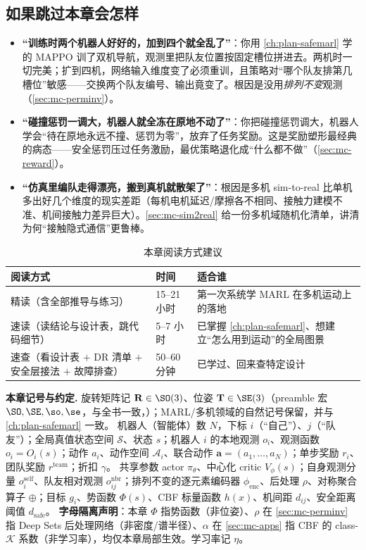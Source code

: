 \subsection*{如果跳过本章会怎样}
\begin{itemize}
  \item \textbf{“训练时两个机器人好好的，加到四个就全乱了”}：你用 \cref{ch:plan-safemarl} 学的 MAPPO 训了双机导航，观测里把队友位置按固定槽位拼进去。两机时一切完美；扩到四机，网络输入维度变了必须重训，且策略对“哪个队友排第几槽位”敏感——交换两个队友编号、输出竟变了。根因是没用\emph{排列不变}观测（\cref{sec:mc-perminv}）。
  \item \textbf{“碰撞惩罚一调大，机器人就全冻在原地不动了”}：你把碰撞惩罚调大，机器人学会“待在原地永远不撞、惩罚为零”，放弃了任务奖励。这是奖励塑形最经典的病态——安全惩罚压过任务激励，最优策略退化成“什么都不做”（\cref{sec:mc-reward}）。
  \item \textbf{“仿真里编队走得漂亮，搬到真机就散架了”}：根因是多机 sim-to-real 比单机多出好几个维度的现实差距（每机电机延迟/摩擦各不相同、接触力建模不准、机间接触力差异巨大）。\cref{sec:mc-sim2real} 给一份多机域随机化清单，讲清为何“接触隐式通信”更鲁棒。
\end{itemize}

\begin{table}[H]\centering\small
\caption{本章阅读方式建议}
\label{tab:mc-reading}
\begin{tabular}{lll}
\toprule
阅读方式 & 时间 & 适合谁 \\
\midrule
精读（含全部推导与练习） & 15--21 小时 & 第一次系统学 MARL 在多机运动上的落地 \\
速读（读结论与设计表，跳代码细节） & 5--7 小时 & 已掌握 \cref{ch:plan-safemarl}、想建立“怎么用到运动”的全局图景 \\
速查（看设计表 $+$ DR 清单 $+$ 安全层接法 $+$ 故障排查） & 50--60 分钟 & 已学过、回来查特定设计 \\
\bottomrule
\end{tabular}
\end{table}

\begin{note}
\textbf{本章记号与约定.}\;
旋转矩阵记 $\mathbf{R}\in\SO(3)$、位姿 $\mathbf{T}\in\SE(3)$（preamble 宏 $\SO,\SE,\so,\se$，与全书一致，）；MARL/多机领域的自然记号保留，并与 \cref{ch:plan-safemarl} 一致。
机器人（智能体）数 $N$，下标 $i$（“自己”）、$j$（“队友”）；全局真值状态空间 $\mathcal{S}$、状态 $s$；机器人 $i$ 的本地观测 $o_i$、观测函数 $o_i=O_i(s)$；动作 $a_i$、动作空间 $\mathcal{A}_i$、联合动作 $\mathbf{a}=(a_1,\dots,a_N)$；单步奖励 $r_i$、团队奖励 $r^{\text{team}}$；折扣 $\gamma$。
共享参数 actor $\pi_\theta$、中心化 critic $V_\phi(s)$；自身观测分量 $o_i^{\text{self}}$、队友相对观测 $o_{ij}^{\text{nbr}}$；排列不变的逐元素编码器 $\phi_{\mathrm{enc}}$、后处理 $\rho$、对称聚合算子 $\oplus$；目标 $g_i$、势函数 $\Phi(s)$、CBF 标量函数 $h(x)$、机间距 $d_{ij}$、安全距离阈值 $d_{\text{safe}}$。
\textbf{字母隔离声明}：本章 $\Phi$ 指势函数（非位姿）、$\rho$ 在 \cref{sec:mc-perminv} 指 Deep Sets 后处理网络（非密度/谱半径）、$\alpha$ 在 \cref{sec:mc-apps} 指 CBF 的 class-$\mathcal{K}$ 系数（非学习率），均仅本章局部生效。学习率记 $\eta$。
\end{note}

